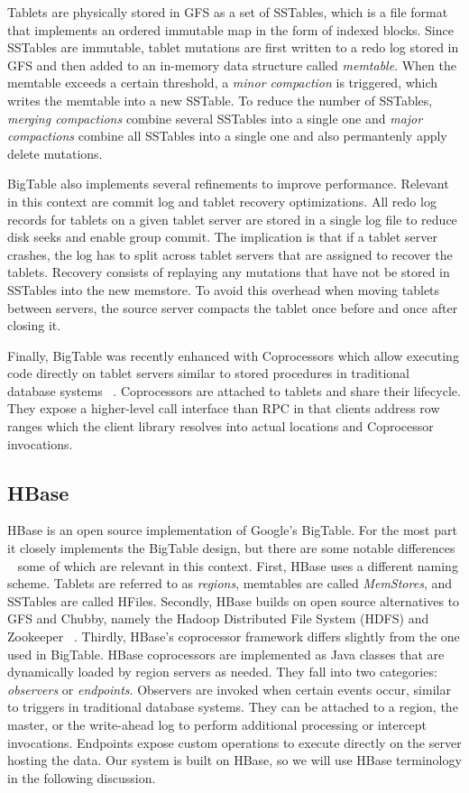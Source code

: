 \documentclass[10pt,final,journal]{IEEEtran}
\begin{document}
Tablets are physically stored in GFS as a set of SSTables, which is a file format that implements an ordered immutable map in the form of indexed blocks. Since SSTables are immutable, tablet mutations are first written to a redo log stored in GFS and then added to an in-memory data structure called \emph{memtable}. When the memtable exceeds a certain threshold, a \emph{minor compaction} is triggered, which writes the memtable into a new SSTable. To reduce the number of SSTables, \emph{merging compactions} combine several SSTables into a single one and \emph{major compactions} combine all SSTables into a single one and also permantenly apply delete mutations.

BigTable also implements several refinements to improve performance. Relevant in this context are commit log and tablet recovery optimizations. All redo log records for tablets on a given tablet server are stored in a single log file to reduce disk seeks and enable group commit. The implication is that if a tablet server crashes, the log has to split across tablet servers that are assigned to recover the tablets. Recovery consists of replaying any mutations that have not be stored in SSTables into the new memstore. To avoid this overhead when moving tablets between servers, the source server compacts the tablet once before and once after closing it.

Finally, BigTable was recently enhanced with Coprocessors which allow executing code directly on tablet servers similar to stored procedures in traditional database systems ~\cite{Dean:2009}. Coprocessors are attached to tablets and share their lifecycle. They expose a higher-level call interface than RPC in that clients address row ranges which the client library resolves into actual locations and Coprocessor invocations.

\subsection{HBase}
HBase is an open source implementation of Google's BigTable. For the most part it closely implements the BigTable design, but there are some notable differences ~\cite{George:2011} some of which are relevant in this context. First, HBase uses a different naming scheme. Tablets are referred to as \emph{regions}, memtables are called \emph{MemStores}, and SSTables are called HFiles. Secondly, HBase builds on open source alternatives to GFS and Chubby, namely the Hadoop Distributed File System (HDFS) and Zookeeper ~\cite{Hunt:2010:ZWC:1855840.1855851}.
Thirdly, HBase's coprocessor framework differs slightly from the one used in BigTable. HBase coprocessors are implemented as Java classes that are dynamically loaded by region servers as needed. They fall into two categories: \emph{observers} or \emph{endpoints}. Observers are invoked when certain events occur, similar to triggers in traditional database systems. They can be attached to a region, the master, or the write-ahead log to perform additional processing or intercept invocations. Endpoints expose custom operations to execute directly on the server hosting the data.
Our system is built on HBase, so we will use HBase terminology in the following discussion.
\end{document}
